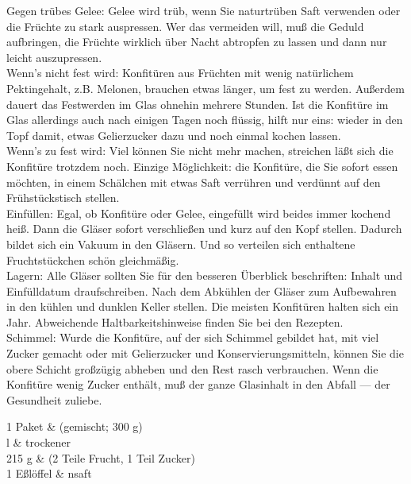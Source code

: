 


      \begin{einleitung}
        Gegen trübes Gelee: Gelee wird trüb, wenn Sie naturtrüben Saft
	verwenden oder die Früchte zu stark auspressen. Wer das vermeiden will,
	muß die Geduld aufbringen, die Früchte wirklich über Nacht abtropfen
	zu lassen und dann nur leicht auszupressen. \\
	Wenn's nicht fest wird: Konfitüren aus Früchten mit wenig natürlichem
	Pektingehalt, z.B. Melonen, brauchen etwas länger, um fest zu werden.
	Außerdem dauert das Festwerden im Glas ohnehin mehrere Stunden. Ist die
	Konfitüre im Glas allerdings auch nach einigen Tagen noch flüssig,
	hilft nur eins: wieder in den Topf damit, etwas Gelierzucker dazu und
	noch einmal kochen lassen. \\
	Wenn's zu fest wird: Viel können Sie nicht mehr machen, streichen läßt
	sich die Konfitüre trotzdem noch. Einzige Möglichkeit: die Konfitüre,
	die Sie sofort essen möchten, in einem Schälchen mit etwas Saft
	verrühren und verdünnt auf den Frühstückstisch stellen. \\
	Einfüllen: Egal, ob Konfitüre oder Gelee, eingefüllt wird beides immer
	kochend heiß. Dann die Gläser sofort verschließen und kurz auf den
	Kopf stellen. Dadurch bildet sich ein Vakuum in den Gläsern. Und so
	verteilen sich enthaltene Fruchtstückchen schön gleichmäßig. \\
	Lagern: Alle Gläser sollten Sie für den besseren Überblick beschriften:
	Inhalt und Einfülldatum draufschreiben. Nach dem Abkühlen der Gläser
	zum Aufbewahren in den kühlen und dunklen Keller stellen. Die meisten
	Konfitüren halten sich ein Jahr. Abweichende Haltbarkeitshinweise
	finden Sie bei den Rezepten. \\
	Schimmel: Wurde die Konfitüre, auf der sich Schimmel gebildet hat, mit
	viel Zucker gemacht oder mit Gelierzucker und Konservierungsmitteln,
	können Sie die obere Schicht großzügig abheben und den Rest rasch
	verbrauchen. Wenn die Konfitüre wenig Zucker enthält, muß der ganze
	Glasinhalt in den Abfall --- der Gesundheit zuliebe. \\
      \end{einleitung}


      \begin{zutaten}
        1 Paket &  (gemischt; 300 g) \\
	\brea{} l & trockener  \\
	215 g &  (2 Teile Frucht,
	        1 Teil Zucker) \\
        1 Eßlöffel & nsaft \\
      \end{zutaten}

